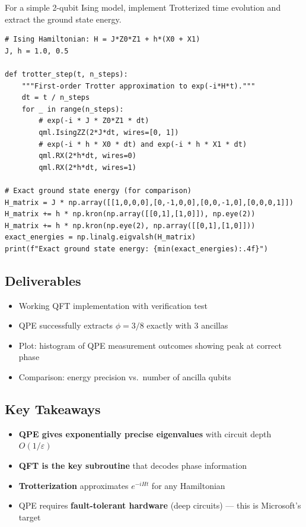 \documentclass[11pt,a4paper]{article}
\begin{document}
For a simple 2-qubit Ising model, implement Trotterized time evolution and extract the ground state energy.
\begin{lstlisting}
# Ising Hamiltonian: H = J*Z0*Z1 + h*(X0 + X1)
J, h = 1.0, 0.5

def trotter_step(t, n_steps):
    """First-order Trotter approximation to exp(-i*H*t)."""
    dt = t / n_steps
    for _ in range(n_steps):
        # exp(-i * J * Z0*Z1 * dt)
        qml.IsingZZ(2*J*dt, wires=[0, 1])
        # exp(-i * h * X0 * dt) and exp(-i * h * X1 * dt)
        qml.RX(2*h*dt, wires=0)
        qml.RX(2*h*dt, wires=1)

# Exact ground state energy (for comparison)
H_matrix = J * np.array([[1,0,0,0],[0,-1,0,0],[0,0,-1,0],[0,0,0,1]])
H_matrix += h * np.kron(np.array([[0,1],[1,0]]), np.eye(2))
H_matrix += h * np.kron(np.eye(2), np.array([[0,1],[1,0]]))
exact_energies = np.linalg.eigvalsh(H_matrix)
print(f"Exact ground state energy: {min(exact_energies):.4f}")
\end{lstlisting}

\subsection*{Deliverables}
\begin{itemize}
    \item[\checkmark] Working QFT implementation with verification test
    \item[\checkmark] QPE successfully extracts $\phi = 3/8$ exactly with 3 ancillas
    \item[\checkmark] Plot: histogram of QPE measurement outcomes showing peak at correct phase
    \item[\checkmark] Comparison: energy precision vs.\ number of ancilla qubits
\end{itemize}

\subsection*{Key Takeaways}
\begin{itemize}
    \item \textbf{QPE gives exponentially precise eigenvalues} with circuit depth $O(1/\varepsilon)$
    \item \textbf{QFT is the key subroutine} that decodes phase information
    \item \textbf{Trotterization} approximates $e^{-iHt}$ for any Hamiltonian
    \item QPE requires \textbf{fault-tolerant hardware} (deep circuits) --- this is Microsoft's target
\end{itemize}
\end{document}
